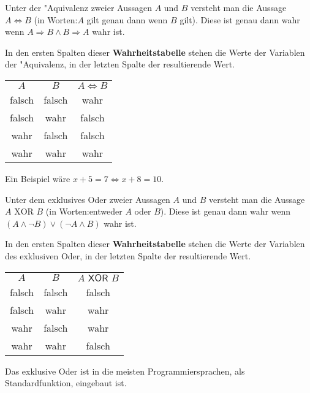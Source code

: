\begin{definition}["Aquivalenz]
Unter der "Aquivalenz zweier Aussagen $A$ und $B$ versteht man die Aussage $A \iff B$ (in Worten:\glqq $A$ gilt genau dann wenn $B$ gilt\grqq ). Diese ist genau dann wahr wenn $A \Rightarrow B \land B \Rightarrow A$ wahr ist. 
\end{definition}
In den ersten Spalten dieser \textbf{Wahrheitstabelle} stehen die Werte der Variablen der "Aquivalenz, in der letzten Spalte der resultierende Wert.
\begin{center}
\begin{tabular}{|c|c||c|}
 $A$ & $B$ & $A \iff B$  \\ 
\cellcolor{ared}falsch & \cellcolor{ared}falsch & \cellcolor{agreen}wahr    \\ 
\cellcolor{ared}falsch & \cellcolor{agreen}wahr & \cellcolor{ared}falsch    \\ 
\cellcolor{agreen}wahr & \cellcolor{ared}falsch & \cellcolor{ared}falsch    \\ 
\cellcolor{agreen}wahr & \cellcolor{agreen}wahr & \cellcolor{agreen}wahr    \\ 
\hline
\end{tabular}
\end{center}
Ein Beispiel wäre $x + 5 = 7 \iff x + 8 = 10$.


\begin{definition}
Unter dem exklusives Oder zweier Aussagen $A$ und $B$ versteht man die Aussage $A \text{ XOR } B$ (in Worten:\glqq entweder $A$ oder $B$\grqq ). Diese ist genau dann wahr wenn $(A \land \neg B) \lor (\neg A \land B)$ wahr ist. 
\end{definition}
In den ersten Spalten dieser \textbf{Wahrheitstabelle} stehen die Werte der Variablen des exklusiven Oder, in der letzten Spalte der resultierende Wert.
\begin{center}
\begin{tabular}{|c|c||c|}
$A$ & $B$ & $A \textsf{ XOR } B$  \\ 
\cellcolor{ared}falsch &  \cellcolor{ared}falsch &  \cellcolor{ared}falsch    \\ 
\cellcolor{ared}falsch & \cellcolor{agreen}wahr & \cellcolor{agreen}wahr    \\ 
\cellcolor{agreen}wahr & \cellcolor{ared}falsch & \cellcolor{agreen}wahr    \\ 
\cellcolor{agreen}wahr & \cellcolor{agreen}wahr & \cellcolor{ared}falsch    \\ 
\hline
\end{tabular}
\end{center}
\begin{warning}
	Das exklusive Oder ist in die meisten Programmiersprachen, als Standardfunktion, eingebaut ist.
\end{warning}

